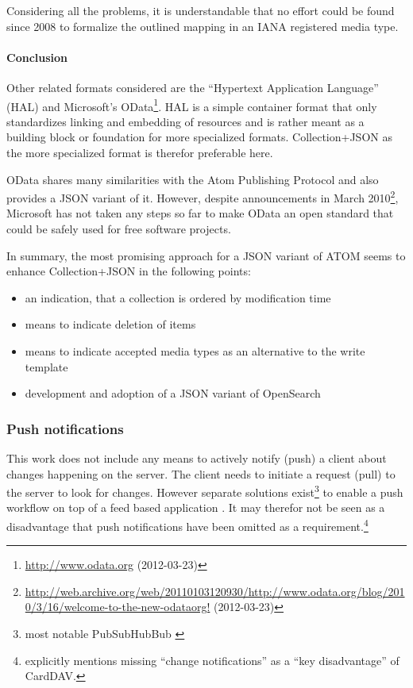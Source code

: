 \documentclass[11pt,a4paper,headsepline,twoside]{scrartcl}		%
\newcommand{\citeurl}[2]{\url{#1} (#2)}
\begin{document}
Considering all the problems, it is understandable that no effort could be found
since 2008 to formalize the outlined mapping in an IANA registered media type.

\paragraph{Conclusion}

Other related formats considered are the ``Hypertext Application Language''
(HAL) \cite{Kelly2011} and Microsoft's
OData\footnote{\citeurl{http://www.odata.org}{2012-03-23}}. HAL is a simple
container format that only standardizes linking and embedding of resources and
is rather meant as a building block or foundation for more specialized
formats. Collection+JSON as the more specialized format is therefor preferable
here.

OData shares many similarities with the Atom Publishing Protocol and also
provides a JSON variant of it. However, despite announcements in March
2010\footnote{\citeurl{http://web.archive.org/web/20110103120930/http://www.odata.org/blog/2010/3/16/welcome-to-the-new-odataorg!}{2012-03-23}},
Microsoft has not taken any steps so far to make OData an open standard that
could be safely used for free software projects.

In summary, the most promising approach for a JSON variant of ATOM seems to
enhance Collection+JSON in the following points:

\begin{itemize}
\item an indication, that a collection is ordered by modification time
\item means to indicate deletion of items
\item means to indicate accepted media types as an alternative to the write
  template
\item development and adoption of a JSON variant of OpenSearch
\end{itemize}


\subsubsection{Push notifications}

This work does not include any means to actively notify (push) a client about
changes happening on the server. The client needs to initiate a request (pull)
to the server to look for changes. However separate solutions
exist\footnote{most notable PubSubHubBub \cite{Fitzpatrick2010}} to enable a push
  workflow on top of a feed based application
  \cite{Wilde:2009:FQP:1693155.1693220}. It may therefor not be seen as a
  disadvantage that push notifications have been omitted as a
  requirement.\footnote{\cite[sec. 1]{RFC6352} explicitly mentions missing
    ``change notifications'' as a ``key disadvantage'' of CardDAV.}
\end{document}
